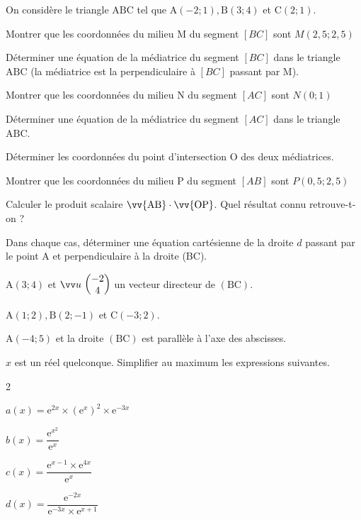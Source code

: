 \documentclass[12pt,a4paper]{article}  %
\begin{document}
On considère le triangle $\mathrm{ABC}$ tel que $\mathrm{A}(-2 ;1), \mathrm{B}(3 ; 4)$ et $\mathrm{C}(2 ; 1)$.
\begin{enumMet}
	\item Montrer que les coordonnées du milieu M du segment $[BC]$ sont $M(2,5;2,5)$
	\item Déterminer une équation de la médiatrice  du segment $[BC]$ dans le triangle $\mathrm{ABC}$ (la médiatrice est la perpendiculaire à $[BC]$ passant par M).
	\item {} Montrer que les coordonnées du milieu N du segment $[AC]$ sont $N(0;1)$
	\item Déterminer une équation de la médiatrice  du segment $[AC]$ dans le triangle $\mathrm{ABC}$.
	\item Déterminer les coordonnées du point d'intersection $\mathrm{O}$ des deux médiatrices.
	\item {} Montrer que les coordonnées du milieu P du segment $[AB]$ sont $P(0,5;2,5)$
	\item Calculer le produit scalaire $\vv{\mathrm{AB}} \cdot \vv{\mathrm{OP}}$. Quel résultat connu retrouve-t-on ?
\end{enumMet}


Dans chaque cas, déterminer une équation cartésienne de la droite $d$ passant par le point $\mathrm{A}$ et perpendiculaire à la droite (BC).
\begin{enumMet}
	\item {} $\mathrm{A}(3 ; 4)$ et $\Coord{u}{-2}{4}$ un vecteur directeur de $(\mathrm{BC})$.
	\item $\mathrm{A}(1 ; 2), \mathrm{B}(2 ;-1)$ et $\mathrm{C}(-3 ; 2)$.
	\item $\mathrm{A}(-4 ; 5)$ et la droite $(\mathrm{BC})$ est parallèle à l'axe des abscisses.
\end{enumMet}

$x$ est un réel quelconque. Simplifier au maximum les expressions suivantes.
\begin{multicols}{2}
	\begin{enumMet}
	\item $a(x)=\mathrm{e}^{2 x} \times\left(\mathrm{e}^x\right)^2 \times \mathrm{e}^{-3 x}$
	\item $b(x)=\dfrac{\mathrm{e}^{x^2}}{\mathrm{e}^x}$
	\item $c(x)=\dfrac{\mathrm{e}^{x-1} \times \mathrm{e}^{4 x}}{\mathrm{e}^x}$
	\item {} $d(x)=\dfrac{\mathrm{e}^{-2 x}}{\mathrm{e}^{-3 x} \times \mathrm{e}^{x+1}}$
\end{enumMet}
\end{multicols}
\end{document}
